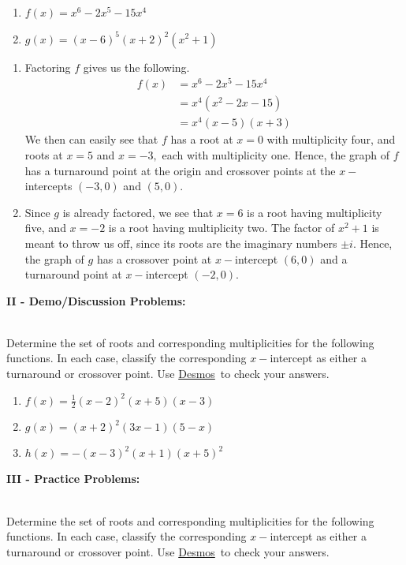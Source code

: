 \documentclass[12pt]{article}
\theoremstyle{definition}
\newcommand{\Desmos}{\href{https://www.desmos.com/}{Desmos}}
\begin{document}
\begin{multicols}{2}
\begin{enumerate}
	\item $f(x)=x^6-2x^5-15x^4$
	\item $g(x)=(x-6)^5(x+2)^2(x^2+1)$
\end{enumerate}
\end{multicols}
\begin{enumerate}
	\item Factoring $f$ gives us the following.
	\begin{equation*}
	\begin{split}
		f(x)&=x^6-2x^5-15x^4\\
		&=x^4(x^2-2x-15)\\
		&=x^4(x-5)(x+3)
	\end{split}
	\end{equation*}
	We then can easily see that $f$ has a root at $x=0$ with multiplicity four, and roots at $x=5$ and $x=-3,$ each with multiplicity one.  Hence, the graph of $f$ has a turnaround point at the origin and crossover points at the $x-$intercepts $(-3,0)$ and $(5,0)$.
	\item Since $g$ is already factored, we see that $x=6$ is a root having multiplicity five, and $x=-2$ is a root having multiplicity two.  The factor of $x^2+1$ is meant to throw us off, since its roots are the imaginary numbers $\pm i$.  Hence, the graph of $g$ has a crossover point at $x-$intercept $(6,0)$ and a turnaround point at $x-$intercept $(-2,0)$.
\end{enumerate}
{\bf II - Demo/Discussion Problems:}\\
\ \par
Determine the set of roots and corresponding multiplicities for the following functions.  In each case, classify the corresponding $x-$intercept as either a turnaround or crossover point.  Use \Desmos \ to check your answers.
\begin{enumerate}
	\item $f(x)=\frac{1}{2}(x-2)^2(x+5)(x-3)$
	\item $g(x)=(x+2)^2(3x-1)(5-x)$
	\item $h(x)=-(x-3)^2(x+1)(x+5)^2$	
\end{enumerate}
{\bf III - Practice Problems:}\\
\ \par
Determine the set of roots and corresponding multiplicities for the following functions.  In each case, classify the corresponding $x-$intercept as either a turnaround or crossover point.  Use \Desmos \ to check your answers.
\end{document}
